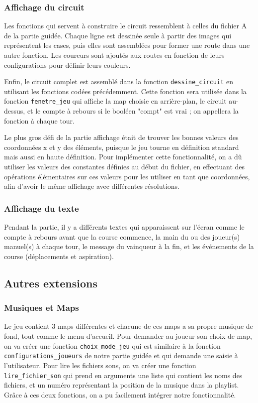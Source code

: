 \documentclass{article}
\begin{document}
\subsubsection{Affichage du circuit}

Les fonctions qui servent à construire le circuit ressemblent à celles du fichier A de la partie guidée. Chaque ligne est dessinée seule à partir des images qui représentent les cases, puis elles sont assemblées pour former une route dans une autre fonction. Les coureurs sont ajoutés aux routes en fonction de leurs configurations pour définir leurs couleurs.

Enfin, le circuit complet est assemblé dans la fonction \texttt{dessine\_circuit} en utilisant les fonctions codées précédemment. Cette fonction sera utilisée dans la fonction \texttt{fenetre\_jeu} qui affiche la map choisie en arrière-plan, le circuit au-dessus, et le compte à rebours si le booléen "compt" est vrai ; on appellera la fonction à chaque tour.

Le plus gros défi de la partie affichage était de trouver les bonnes valeurs des coordonnées x et y des éléments, puisque le jeu tourne en définition standard mais aussi en haute définition. Pour implémenter cette fonctionnalité, on a dû utiliser les valeurs des constantes définies au début du fichier, en effectuant des opérations élémentaires sur ces valeurs pour les utiliser en tant que coordonnées, afin d'avoir le même affichage avec différentes résolutions.

\subsubsection{Affichage du texte}

Pendant la partie, il y a différents textes qui apparaissent sur l'écran comme le compte à rebours avant que la course commence, la main du ou des joueur(s) manuel(s) à chaque tour, le message du vainqueur à la fin, et les événements de la course (déplacements et aspiration).

\subsection{Autres extensions}

\subsubsection{Musiques et Maps}

Le jeu contient 3 maps différentes et chacune de ces maps a sa propre musique de fond, tout comme le menu d'accueil. Pour demander au joueur son choix de map, on va créer une fonction \texttt{choix\_mode\_jeu} qui est similaire à la fonction \texttt{configurations\_joueurs} de notre partie guidée et qui demande une saisie à l'utilisateur. Pour lire les fichiers sons, on va créer une fonction \texttt{lire\_fichier\_son} qui prend en arguments une liste qui contient les noms des fichiers, et un numéro représentant la position de la musique dans la playlist. Grâce à ces deux fonctions, on a pu facilement intégrer notre fonctionnalité.
\end{document}
